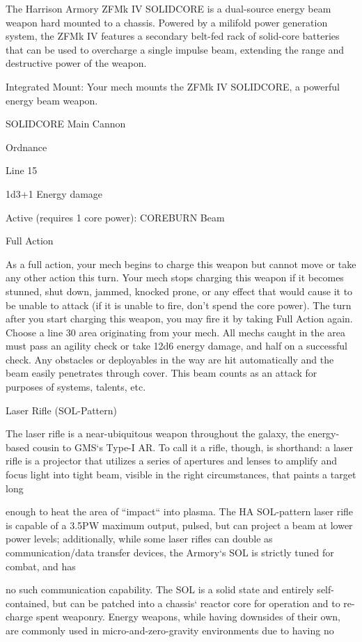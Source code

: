  The Harrison Armory ZFMk IV SOLIDCORE is a dual-source energy beam weapon hard mounted to a  
 chassis. Powered by a milifold power generation system, the ZFMk IV features a secondary belt-fed  
 rack of solid-core batteries that can be used to overcharge a single impulse beam, extending the range  
 and destructive power of the weapon.      

  Integrated Mount: Your mech mounts the ZFMk IV SOLIDCORE, a powerful energy beam weapon.
 
 SOLIDCORE  
  Main Cannon
 
 Ordnance
 
  Line 15
 
  1d3+1 Energy damage
 

 Active (requires 1 core power): COREBURN Beam
 
  Full Action
 
 As a full action, your mech begins to charge this weapon but cannot move or take any other action this  
 turn. Your mech stops charging this weapon if it becomes stunned, shut down, jammed, knocked  
  prone, or any effect that would cause it to be unable to attack (if it is unable to fire, don’t spend the  
 core power). The turn after you start charging this weapon, you may fire it by taking Full Action again.  
 Choose a line 30 area originating from your mech. All mechs caught in the area must pass an agility  
 check or take 12d6 energy damage, and half on a successful check. Any obstacles or deployables in  
 the way are hit automatically and the beam easily penetrates through cover. This beam counts as an  
 attack for purposes of systems, talents, etc. 

Laser Rifle (SOL-Pattern)  

The laser rifle is a near-ubiquitous weapon throughout the galaxy, the energy-based cousin to GMS‘s Type-I  
AR. To call it a rifle, though, is shorthand: a laser rifle is a projector that utilizes a series of apertures and  
lenses to amplify and focus light into tight beam, visible in the right circumstances, that paints a target long  

enough to heat the area of “impact“ into plasma. The HA SOL-pattern laser rifle is capable of a 3.5PW  
maximum output, pulsed, but can project a beam at lower power levels; additionally, while some laser rifles  
can double as communication/data transfer devices, the Armory‘s SOL is strictly tuned for combat, and has  

no such communication capability. The SOL is a solid state and entirely self-contained, but can be patched  
into a chassis‘ reactor core for operation and to re-charge spent weaponry. Energy weapons, while having  
downsides of their own, are commonly used in micro-and-zero-gravity environments due to having no  

